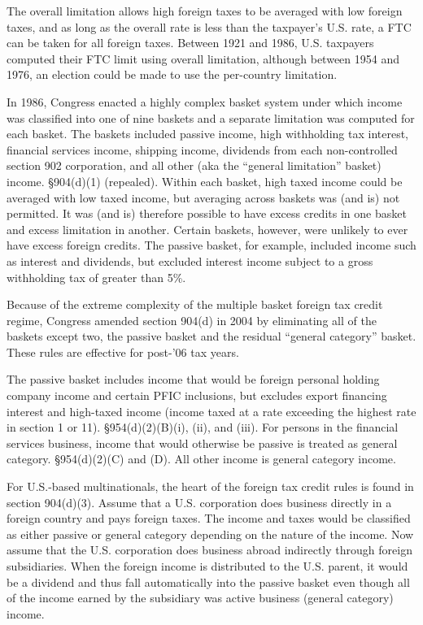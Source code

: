 The overall limitation allows high foreign taxes to be averaged with low foreign taxes, and as long as the overall rate is less than the taxpayer's U.S. rate, a FTC can be taken for all foreign taxes.  Between 1921 and 1986, U.S. taxpayers computed their FTC limit using overall limitation, although between 1954 and 1976, an election could be made to use the per-country limitation.  

In 1986, Congress enacted a highly complex basket system under which income was classified into one of nine baskets and a separate limitation was computed for each basket.  The baskets included passive income, high withholding tax interest, financial services income, shipping income, dividends from each non-controlled section 902 corporation, and all other (aka the ``general limitation'' basket) income.  \S904(d)(1) (repealed).  Within each basket, high taxed income could be averaged with low taxed income, but averaging across baskets was (and is)  not permitted.  It was (and is) therefore possible to have excess credits in one basket and excess limitation in another.  Certain baskets, however, were unlikely to ever have excess foreign credits.  The passive basket, for example, included income such as interest and dividends, but excluded interest income subject to a gross withholding tax of greater than 5\%.  

Because of the extreme complexity of the multiple basket foreign tax credit regime, Congress amended section 904(d) in 2004 by eliminating all of the baskets except two, the passive basket and the residual ``general category'' basket.  These rules are effective for post-'06 tax years.

The passive basket includes income that would be foreign personal holding company income and certain PFIC inclusions, but excludes export financing interest and high-taxed income (income taxed at a rate exceeding the highest rate in section 1 or 11).  \S954(d)(2)(B)(i), (ii), and (iii).  For persons in the financial services business, income that would otherwise be passive is treated as general category.  \S954(d)(2)(C) and (D).  All other income is general category income.

For U.S.-based multinationals, the heart of the foreign tax credit rules is found in section 904(d)(3).  Assume that a U.S. corporation does business directly in a foreign country and pays foreign taxes.  The income and taxes would be classified as either passive or general category depending on the nature of the income.  Now assume that the U.S. corporation does business abroad indirectly through foreign subsidiaries.  When the foreign income is distributed to the U.S. parent, it would be a dividend and thus fall automatically into the passive basket even though all of the income earned by the subsidiary was active business (general category) income.  

